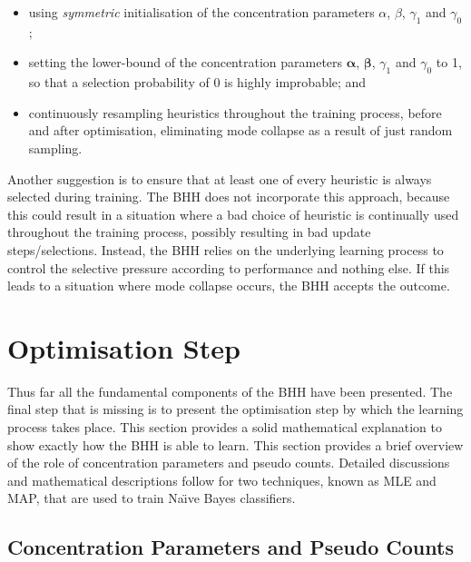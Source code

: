 \begin{itemize}
      \item using \textit{symmetric} initialisation of the concentration parameters $\alpha$, $\beta$, $\gamma_{1}$ and $\gamma_{0}$;

      \item setting the lower-bound of the concentration parameters $\boldsymbol{\alpha}$, $\boldsymbol{\beta}$, $\gamma_{1}$ and $\gamma_{0}$ to 1, so that a selection probability of 0 is highly improbable; and

      \item continuously resampling heuristics throughout the training process, before and after optimisation, eliminating mode collapse as a result of just random sampling.
\end{itemize}

Another suggestion is to ensure that at least one of every heuristic is always selected during training. The \acs{BHH} does not incorporate this approach, because this could result in a situation where a bad choice of heuristic is continually used throughout the training process, possibly resulting in bad update steps/selections. Instead, the \acs{BHH} relies on the underlying learning process to control the selective pressure according to performance and nothing else. If this leads to a situation where mode collapse occurs, the \acs{BHH} accepts the outcome.

\section{Optimisation Step}\label{sec:bhh:optimisation_step}

Thus far all the fundamental components of the \acs{BHH} have been presented. The final step that is missing is to present the optimisation step by which the learning process takes place. This section provides a solid mathematical explanation to show exactly how the \acs{BHH} is able to learn. This section provides a brief overview of the role of concentration parameters and pseudo counts. Detailed discussions and mathematical descriptions follow for two techniques, known as \acs{MLE} and \acs{MAP}, that are used to train Na\"{\i}ve Bayes classifiers.

\subsection{Concentration Parameters and Pseudo Counts}\label{sec:bhh:optimisation_step:concentration_pseudo_counts}

